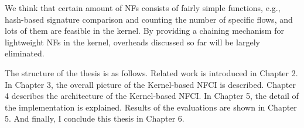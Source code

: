 We think that certain amount of NFs consists of fairly simple functions, e.g., hash-based signature comparison and counting the number of specific flows,  and lots of them are feasible in the kernel. By providing a chaining mechanism for lightweight NFs in the kernel, overheads discussed so far will be largely eliminated. 

The structure of the thesis is as follows. Related work is introduced in Chapter 2. In Chapter 3, the overall picture of the Kernel-based NFCI is described. Chapter 4 describes the architecture of the Kernel-based NFCI. In Chapter 5, the detail of the implementation is explained. Results of the evaluations are shown in Chapter 5. And finally, I conclude this thesis in Chapter 6. 











